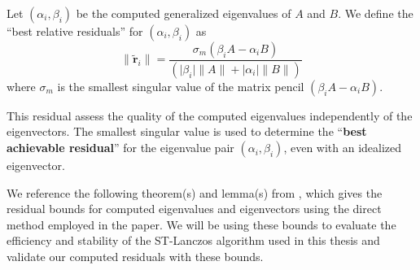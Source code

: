 \begin{definition}\label{def:BestResidual}
	Let $(\alpha_i, \beta_i)$ be the computed generalized eigenvalues of $A$ and $B$. We define the ``best relative residuals'' for $(\alpha_i, \beta_i)$ as
	\begin{equation}\label{eq:BestResiduals}
		\|\tilde{\mathbf{r}}_i\| = \frac{\sigma_m(\beta_i A - \alpha_i B)}{(\lvert \beta_i \rvert \|A\| + \lvert \alpha_i \rvert \|B\|)}
	\end{equation}
where $\sigma_m$ is the smallest singular value of the matrix pencil $(\beta_i A - \alpha_i B)$.
\end{definition}
This residual assess the quality of the computed eigenvalues independently of the eigenvectors. The smallest singular value is used to determine the ``\textbf{best achievable residual}'' for the eigenvalue pair $(\alpha_i, \beta_i)$, even with an idealized eigenvector.

We reference the following theorem(s) and lemma(s) from \cite{stewart2024spectraltransformationdensesymmetric}, which gives the residual bounds for computed eigenvalues and eigenvectors using the direct method employed in the paper. We will be using these bounds to evaluate the efficiency and stability of the ST-Lanczos algorithm used in this thesis and validate our computed residuals with these bounds.

